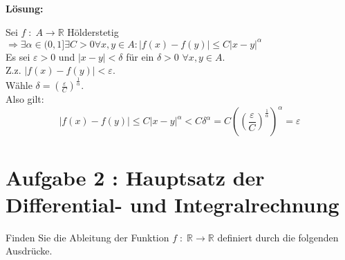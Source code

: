 \documentclass[11pt,a4paper,ngerman]{article}
\begin{document}
\begin{enumerate}[\bfseries a)]
\textbf{Lösung:}

Sei $f \; : \; A \rightarrow \mathbb{R}$ Hölderstetig \\
$\Rightarrow \exists \alpha \in (0,1] \exists C > 0 \forall x,y \in A: \left| f(x) - f(y)\right| \leq C \left| x - y \right|^\alpha$ \\
Es sei $\varepsilon > 0$ und $ \left| x - y\right| < \delta$ für ein $\delta > 0$ $\forall x,y \in A$.\\

Z.z. $\left| f(x) - f(y)\right| < \varepsilon$.\\
Wähle $\delta = \left( \frac{\varepsilon}{C} \right)^{\frac{1}{\alpha}}$.\\
Also gilt:
$$
  \left| f(x) - f(y)\right| \leq C \left| x - y \right|^\alpha
< C \delta^\alpha = C \left( \left( \frac{\varepsilon}{C} \right)^{\frac{1}{\alpha}}\right)^\alpha
= \varepsilon
$$

\end{enumerate}


\section*{Aufgabe 2 : \mdseries Hauptsatz der Differential- und Integralrechnung}

Finden Sie die Ableitung der Funktion $f \; : \; \mathbb{R} \rightarrow \mathbb{R}$ definiert durch die folgenden Ausdrücke.
\end{document}
